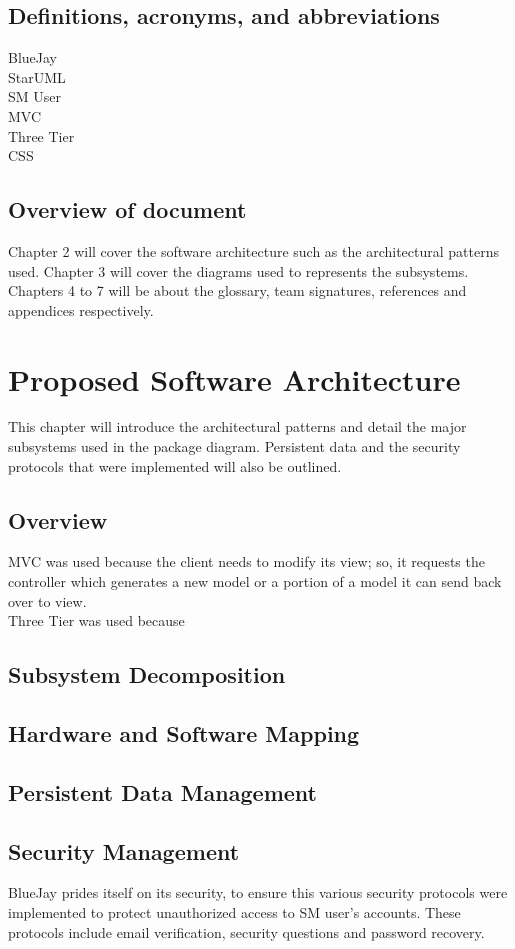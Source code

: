 \documentclass{report}
\begin{document}
\section{Definitions, acronyms, and abbreviations}
BlueJay\\StarUML\\SM User\\MVC\\Three Tier\\CSS
\section{Overview of document}
		Chapter 2 will cover the software architecture such as the architectural patterns used. Chapter 3 will cover the diagrams used to represents the subsystems. Chapters 4 to 7 will be about the glossary, team signatures, references and appendices respectively.
\chapter{Proposed Software Architecture}
	This chapter will introduce the architectural patterns and detail the major subsystems used in the package diagram. Persistent data and the security protocols that were implemented will also be outlined.
\section{Overview}
	MVC was used because the client needs to modify its view; so, it requests the controller which generates a new model or a portion of a model it can send back over to view.\\
	Three Tier was used because
\section{Subsystem Decomposition}
\section{Hardware and Software Mapping}
\section{Persistent Data Management}
\section{Security Management}
	BlueJay prides itself on its security, to ensure this various security protocols were implemented to protect unauthorized access to SM user’s accounts. These protocols include email verification, security questions and password recovery. 
\end{document}
